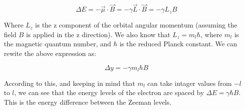 \begin{equation}
    \Delta E = - \vec{\mu} \cdot \vec{B} = - \gamma \vec{L} \cdot \vec{B} = - \gamma L_z B
\end{equation}

Where $L_z$ is the z component of the orbital angular momentum (assuming the field $B$ is applied in the z direction). We also know that
$L_z = m_l \hbar$, where $m_l$ is the magnetic quantum number, and $\hbar$ is the reduced Planck constant. We can rewite the above expression as:

\begin{equation}
    \Delta y = - \gamma m_l \hbar B
\end{equation}

According to this, and keeping in mind that $m_l$ can take intager values from $-l$ to $l$, we can see that the energy levels of the electron
are spaced by $\Delta E = \gamma \hbar B$. This is the energy difference between the Zeeman levels.